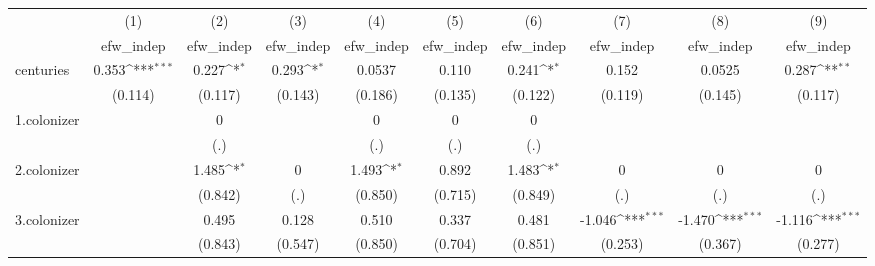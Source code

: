 {
\def\sym#1{\ifmmode^{#1}\else\(^{#1}\)\fi}
\begin{tabular}{l*{9}{c}}
\hline\hline
            &\multicolumn{1}{c}{(1)}&\multicolumn{1}{c}{(2)}&\multicolumn{1}{c}{(3)}&\multicolumn{1}{c}{(4)}&\multicolumn{1}{c}{(5)}&\multicolumn{1}{c}{(6)}&\multicolumn{1}{c}{(7)}&\multicolumn{1}{c}{(8)}&\multicolumn{1}{c}{(9)}\\
            &\multicolumn{1}{c}{efw\_indep}&\multicolumn{1}{c}{efw\_indep}&\multicolumn{1}{c}{efw\_indep}&\multicolumn{1}{c}{efw\_indep}&\multicolumn{1}{c}{efw\_indep}&\multicolumn{1}{c}{efw\_indep}&\multicolumn{1}{c}{efw\_indep}&\multicolumn{1}{c}{efw\_indep}&\multicolumn{1}{c}{efw\_indep}\\
\hline
centuries   &       0.353\sym{***}&       0.227\sym{*}  &       0.293\sym{*}  &      0.0537         &       0.110         &       0.241\sym{*}  &       0.152         &      0.0525         &       0.287\sym{**} \\
            &     (0.114)         &     (0.117)         &     (0.143)         &     (0.186)         &     (0.135)         &     (0.122)         &     (0.119)         &     (0.145)         &     (0.117)         \\
[1em]
1.colonizer &                     &           0         &                     &           0         &           0         &           0         &                     &                     &                     \\
            &                     &         (.)         &                     &         (.)         &         (.)         &         (.)         &                     &                     &                     \\
[1em]
2.colonizer &                     &       1.485\sym{*}  &           0         &       1.493\sym{*}  &       0.892         &       1.483\sym{*}  &           0         &           0         &           0         \\
            &                     &     (0.842)         &         (.)         &     (0.850)         &     (0.715)         &     (0.849)         &         (.)         &         (.)         &         (.)         \\
[1em]
3.colonizer &                     &       0.495         &       0.128         &       0.510         &       0.337         &       0.481         &      -1.046\sym{***}&      -1.470\sym{***}&      -1.116\sym{***}\\
            &                     &     (0.843)         &     (0.547)         &     (0.850)         &     (0.704)         &     (0.851)         &     (0.253)         &     (0.367)         &     (0.277)         \\

\end{tabular}}
